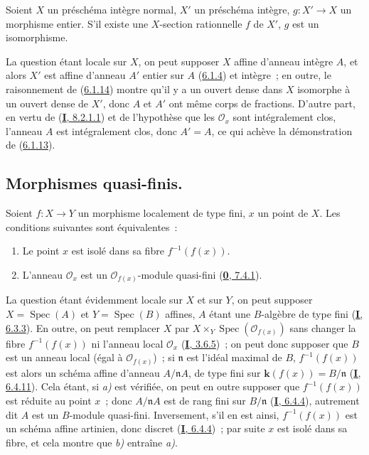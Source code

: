 \begin{corollary}[6.1.15]
\label{II.6.1.15-fr}
Soient $X$ un préschéma intègre normal, $X'$ un préschéma intègre,
$g:X'\to X$ un morphisme \textup{entier}. S'il existe une $X$-section rationnelle $f$
de $X'$, $g$ est un isomorphisme.
\end{corollary}

La question étant locale sur $X$, on peut supposer $X$ affine d'anneau
intègre $A$, et alors $X'$ est affine d'anneau $A'$ entier sur $A$
(\hyperref[II.6.1.4-fr]{6.1.4}) et intègre~; en outre, le raisonnement de
(\hyperref[II.6.1.14-fr]{6.1.14}) montre qu'il y a un ouvert dense dans $X$
isomorphe à un ouvert dense de $X'$, donc $A$ et $A'$ ont même corps de
fractions. D'autre part, en vertu de
(\hyperref[I.8.2.1.1-fr]{\textbf{I}, 8.2.1.1}) et de l'hypothèse que les
$\mathcal{O}_x$ sont intégralement clos, l'anneau $A$ est intégralement clos,
donc $A'=A$, ce qui achève la démonstration de
(\hyperref[II.6.1.13-fr]{6.1.13}).

\subsection{Morphismes quasi-finis.}
\label{subsection:II.6.2-fr}

\begin{proposition}[6.2.1]
\label{II.6.2.1-fr}
Soient $f:X\to Y$ un morphisme localement de type fini, $x$ un point de $X$.
Les conditions suivantes sont équivalentes~:


\begin{enumerate}
\item[\textup{a)}] Le point $x$ est isolé dans sa fibre $f^{-1}(f(x))$.
\item[\textup{b)}] L'anneau $\mathcal{O}_x$ est un $\mathcal{O}_{f(x)}$-module
quasi-fini \upshape(\hyperref[0.7.4.1-fr]{\textbf{0}, 7.4.1}).
\end{enumerate}
\end{proposition}

La question étant évidemment locale sur $X$ et sur $Y$, on peut supposer
$X=\operatorname{Spec}(A)$ et $Y=\operatorname{Spec}(B)$ affines, $A$ étant
une $B$-algèbre de type fini (\hyperref[I.6.3.3-fr]{\textbf{I}, 6.3.3}). En outre, on
peut remplacer $X$ par $X\times_Y\operatorname{Spec}(\mathcal{O}_{f(x)})$
sans changer la fibre $f^{-1}(f(x))$ ni l'anneau local $\mathcal{O}_x$
(\hyperref[I.3.6.5-fr]{\textbf{I}, 3.6.5})~; on peut donc supposer que $B$ est un
anneau local (égal à $\mathcal{O}_{f(x)}$)~; si $\mathfrak{n}$ est l'idéal
maximal de $B$, $f^{-1}(f(x))$ est alors un schéma affine d'anneau
$A/\mathfrak{n}A$, de type fini sur $\boldsymbol{k}(f(x))=B/\mathfrak{n}$
(\hyperref[I.6.4.11-fr]{\textbf{I}, 6.4.11}). Cela étant, si \emph{a)} est vérifiée, on peut
en outre supposer que $f^{-1}(f(x))$ est réduite au point $x$~; donc
$A/\mathfrak{n}A$ est de rang fini sur $B/\mathfrak{n}$
(\hyperref[I.6.4.4-fr]{\textbf{I}, 6.4.4}), autrement dit $A$ est un $B$-module
quasi-fini. Inversement, s'il en est ainsi, $f^{-1}(f(x))$ est un schéma
affine artinien, donc discret (\hyperref[I.6.4.4-fr]{\textbf{I}, 6.4.4})~; par suite
$x$ est isolé dans sa fibre, et cela montre que \emph{b)} entraîne \emph{a)}.

